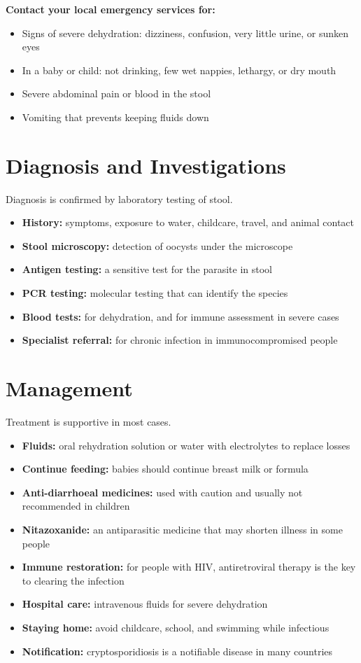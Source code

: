 \textbf{Contact your local emergency services for:}
\begin{itemize}
    \item Signs of severe dehydration: dizziness, confusion, very little urine, or sunken eyes
    \item In a baby or child: not drinking, few wet nappies, lethargy, or dry mouth
    \item Severe abdominal pain or blood in the stool
    \item Vomiting that prevents keeping fluids down
\end{itemize}

\section*{Diagnosis and Investigations}
Diagnosis is confirmed by laboratory testing of stool.

\begin{itemize}
    \item \textbf{History:} symptoms, exposure to water, childcare, travel, and animal contact
    \item \textbf{Stool microscopy:} detection of oocysts under the microscope
    \item \textbf{Antigen testing:} a sensitive test for the parasite in stool
    \item \textbf{PCR testing:} molecular testing that can identify the species
    \item \textbf{Blood tests:} for dehydration, and for immune assessment in severe cases
    \item \textbf{Specialist referral:} for chronic infection in immunocompromised people
\end{itemize}

\section*{Management}
Treatment is supportive in most cases.

\begin{itemize}
    \item \textbf{Fluids:} oral rehydration solution or water with electrolytes to replace losses
    \item \textbf{Continue feeding:} babies should continue breast milk or formula
    \item \textbf{Anti-diarrhoeal medicines:} used with caution and usually not recommended in children
    \item \textbf{Nitazoxanide:} an antiparasitic medicine that may shorten illness in some people
    \item \textbf{Immune restoration:} for people with HIV, antiretroviral therapy is the key to clearing the infection
    \item \textbf{Hospital care:} intravenous fluids for severe dehydration
    \item \textbf{Staying home:} avoid childcare, school, and swimming while infectious
    \item \textbf{Notification:} cryptosporidiosis is a notifiable disease in many countries
\end{itemize}

